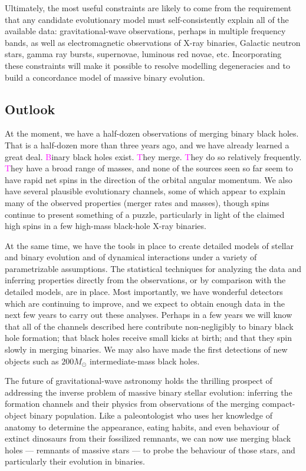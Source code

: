 \documentclass[iop,onecolumn]{revtex4}
\newcommand{\ilya}[1]{\textcolor{magenta}{#1}}
\begin{document}
Ultimately, the most useful constraints are likely to come from the requirement that any candidate evolutionary model must self-consistently explain all of the available data: gravitational-wave observations, perhaps in multiple frequency bands, as well as electromagnetic observations of X-ray binaries, Galactic neutron stars, gamma ray bursts, supernovae, luminous red novae, etc. Incorporating these constraints will make it possible to resolve modelling degeneracies and to build a concordance model of massive binary evolution.  

\subsection{Outlook}

At the moment, we have a half-dozen observations of merging binary black holes.  That is a half-dozen more than three years ago, and we have already learned a great deal.  \ilya{B}inary black holes exist. \ilya{T}hey merge. \ilya{T}hey do so relatively frequently.  \ilya{T}hey have a broad range of masses, and none of the sources seen so far seem to have rapid net spins in the direction of the orbital angular momentum.  We also have several plausible evolutionary channels, some of which appear to explain many of the observed properties (merger rates and masses), though spins continue to present something of a puzzle, particularly in light of the claimed high spins in a few high-mass black-hole X-ray binaries.

At the same time, we have the tools in place to create detailed models of stellar and binary evolution and of dynamical interactions under a variety of parametrizable assumptions.  The statistical techniques for analyzing the data and inferring properties directly from the observations, or by comparison with the detailed models, are in place.  Most importantly, we have wonderful detectors which are continuing to improve, and we expect to obtain enough data in the next few years to carry out these analyses.  Perhaps in a few years we will know that all of the channels described here contribute non-negligibly to binary black hole formation; that black holes receive small kicks at birth; and that they spin slowly in merging binaries. We may also have made the first detections of new objects such as $200 M_\odot$ intermediate-mass black holes.

The future of gravitational-wave astronomy holds the thrilling prospect of addressing the inverse problem of massive binary stellar evolution: inferring the formation channels and their physics from observations of the merging compact-object binary population.  Like a paleontologist who uses her knowledge of anatomy to determine the appearance, eating habits, and even behaviour of extinct dinosaurs from their fossilized remnants, we can now use merging black holes --- remnants of massive stars --- to probe the behaviour of those stars, and particularly their evolution in binaries.
\end{document}
